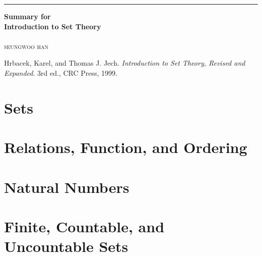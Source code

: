 \documentclass[a4paper,12pt]{report}
\begin{document}

\begin{titlepage}
	\raggedleft

	\rule{1pt}{\textheight}
	\hspace{0.05\textwidth}
	\parbox[b]{0.75\textwidth}{

		{\Huge\bfseries Summary for\\[0.5\baselineskip] Introduction to Set Theory}\\[2\baselineskip]
		\\[4\baselineskip]
		{\Large\textsc{seungwoo han}}

		\vspace{0.5\textheight}

        {\noindent
        Hrbacek, Karel, and Thomas J. Jech.
        \textit{Introduction to Set Theory, Revised and Expanded}. 3rd ed.,
        CRC Press, 1999.}\\[\baselineskip]
	}
\end{titlepage}
\tableofcontents
\hypersetup{
    colorlinks=true,
    linkcolor=red!50!black,
    filecolor=black,
    urlcolor=red!50!black,
}
\pagebreak

\chapter{Sets}\label{chap:sets}

\chapter{Relations, Function, and Ordering}\label{chap:relFuncOrder}



\chapter{Natural Numbers}\label{chap:nat}




\chapter{Finite, Countable, and Uncountable Sets}\label{chap:finite}





\end{document}
